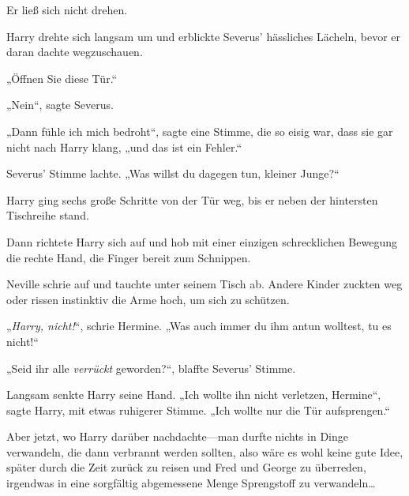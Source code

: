 Er ließ sich nicht drehen.

Harry drehte sich langsam um und erblickte Severus’ hässliches Lächeln, bevor er daran dachte wegzuschauen.

„Öffnen Sie diese Tür.“

„Nein“, sagte Severus.

„Dann fühle ich mich bedroht“, sagte eine Stimme, die so eisig war, dass sie gar nicht nach Harry klang, „und das ist ein Fehler.“

Severus’ Stimme lachte. „Was willst du dagegen tun, kleiner Junge?“

Harry ging sechs große Schritte von der Tür weg, bis er neben der hintersten Tischreihe stand.

Dann richtete Harry sich auf und hob mit einer einzigen schrecklichen Bewegung die rechte Hand, die Finger bereit zum Schnippen.

Neville schrie auf und tauchte unter seinem Tisch ab. Andere Kinder zuckten weg oder rissen instinktiv die Arme hoch, um sich zu schützen.

„\emph{Harry, nicht!}“, schrie Hermine. „Was auch immer du ihm antun wolltest, tu es nicht!“

„Seid ihr alle \emph{verrückt} geworden?“, blaffte Severus’ Stimme.

Langsam senkte Harry seine Hand. „Ich wollte ihn nicht verletzen, Hermine“, sagte Harry, mit etwas ruhigerer Stimme. „Ich wollte nur die Tür aufsprengen.“

Aber jetzt, wo Harry darüber nachdachte—man durfte nichts in Dinge verwandeln, die dann verbrannt werden sollten, also wäre es wohl keine gute Idee, später durch die Zeit zurück zu reisen und Fred und George zu überreden, irgendwas in eine sorgfältig abgemessene Menge Sprengstoff zu verwandeln…


